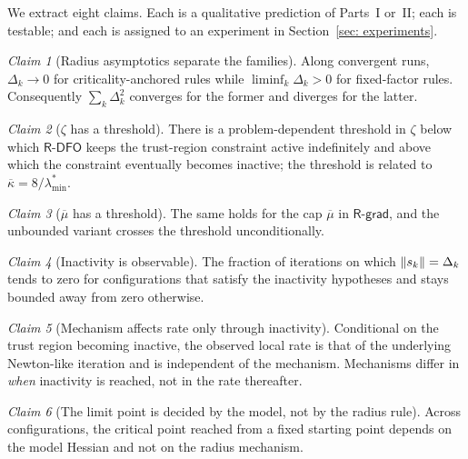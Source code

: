 \documentclass[11pt]{article}
\theoremstyle{plain}
\theoremstyle{definition}
\theoremstyle{remark}
\newtheorem{claimP}{Claim}
\numberwithin{equation}{section}
\newcommand{\Rdfo}{\textsf{R-DFO}}
\newcommand{\Rgrad}{\textsf{R-grad}}
\begin{document}
We extract eight claims. Each is a qualitative prediction of Parts~I or~II; each is testable;
and each is assigned to an experiment in Section~\ref{sec: experiments}.

\begin{claimP}[Radius asymptotics separate the families]
\label{claim: asymptotics}
Along convergent runs, $\Delta_k \to 0$ for criticality-anchored rules while
$\liminf_k \Delta_k > 0$ for fixed-factor rules. Consequently $\sum_k \Delta_k^2$ converges for
the former and diverges for the latter.
\end{claimP}

\begin{claimP}[$\zeta$ has a threshold]
\label{claim: zeta}
There is a problem-dependent threshold in $\zeta$ below which $\Rdfo$ keeps the trust-region
constraint active indefinitely and above which the constraint eventually becomes inactive; the
threshold is related to $\overline{\kappa} = 8/\lambda^*_{\min}$.
\end{claimP}

\begin{claimP}[$\overline{\mu}$ has a threshold]
\label{claim: mu}
The same holds for the cap $\overline{\mu}$ in $\Rgrad$, and the unbounded variant crosses the
threshold unconditionally.
\end{claimP}

\begin{claimP}[Inactivity is observable]
\label{claim: inactivity}
The fraction of iterations on which $\left \lVert s_k \right \rVert = \Delta_k$ tends to zero for configurations
that satisfy the inactivity hypotheses and stays bounded away from zero otherwise.
\end{claimP}

\begin{claimP}[Mechanism affects rate only through inactivity]
\label{claim: rate}
Conditional on the trust region becoming inactive, the observed local rate is that of the
underlying Newton-like iteration and is independent of the mechanism. Mechanisms differ in
\emph{when} inactivity is reached, not in the rate thereafter.
\end{claimP}

\begin{claimP}[The limit point is decided by the model, not by the radius rule]
\label{claim: limit}
Across configurations, the critical point reached from a fixed starting point depends on the
model Hessian and not on the radius mechanism.
\end{claimP}
\end{document}
